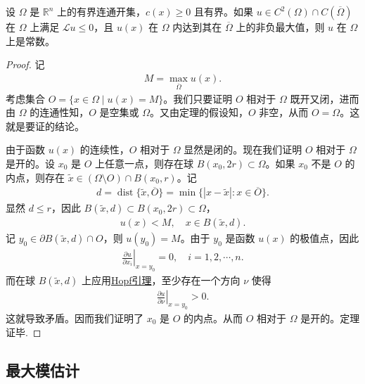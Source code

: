 \documentclass[../../main.tex]{subfiles}%
\begin{document}
\begin{theorem}[强极值原理]\label{theorem:PDE-强极值原理1}
设 $\Omega$ 是 $\mathbb{R}^n$ 上的有界连通开集，$c(x)\geqslant 0$ 且有界。如果 $u\in C^2(\Omega)\cap C(\overline{\Omega})$ 在 $\Omega$ 上满足 $\mathcal{L}u\leqslant 0$，且 $u(x)$ 在 $\Omega$ 内达到其在 $\overline{\Omega}$ 上的非负最大值，则 $u$ 在 $\Omega$ 上是常数。
\end{theorem}
\begin{proof}
记
\begin{align*}
M = \max_{\overline{\Omega}} u(x).
\end{align*}
考虑集合 $O=\{x\in\Omega \mid u(x)=M\}$。我们只要证明 $O$ 相对于 $\Omega$ 既开又闭，进而由 $\Omega$ 的连通性知，$O$ 是空集或 $\Omega$。又由定理的假设知，$O$ 非空，从而 $O=\Omega$。这就是要证的结论。

由于函数 $u(x)$ 的连续性，$O$ 相对于 $\Omega$ 显然是闭的。现在我们证明 $O$ 相对于 $\Omega$ 是开的。设 $x_0$ 是 $O$ 上任意一点，则存在球 $B(x_0,2r)\subset\Omega$。如果 $x_0$ 不是 $O$ 的内点，则存在 $\tilde{x}\in(\Omega\setminus O)\cap B(x_0,r)$。记
\begin{align*}
d = \operatorname{dist}\{\tilde{x},\overline{O}\} = \min\{|x-\tilde{x}| : x\in\overline{O}\}.
\end{align*}
显然 $d\leqslant r$，因此 $B(\tilde{x},d)\subset B(x_0,2r)\subset\Omega$，
\begin{align*}
u(x) < M, \quad x\in B(\tilde{x},d).
\end{align*}
记 $y_0\in\partial B(\tilde{x},d)\cap O$，则 $u(y_0)=M$。由于 $y_0$ 是函数 $u(x)$ 的极值点，因此
\begin{align*}
\left.\frac{\partial u}{\partial x_i}\right|_{x=y_0} = 0, \quad i=1,2,\cdots,n.
\end{align*}
而在球 $B(\tilde{x},d)$ 上应用\hyperref[theorem:Hopf引理]{Hopf引理}，至少存在一个方向 $\nu$ 使得
\begin{align*}
\left.\frac{\partial u}{\partial \nu}\right|_{x=y_0} > 0.
\end{align*}
这就导致矛盾。因而我们证明了 $x_0$ 是 $O$ 的内点。从而 $O$ 相对于 $\Omega$ 是开的。定理证毕.
\end{proof}

\subsection{最大模估计}
\end{document}

